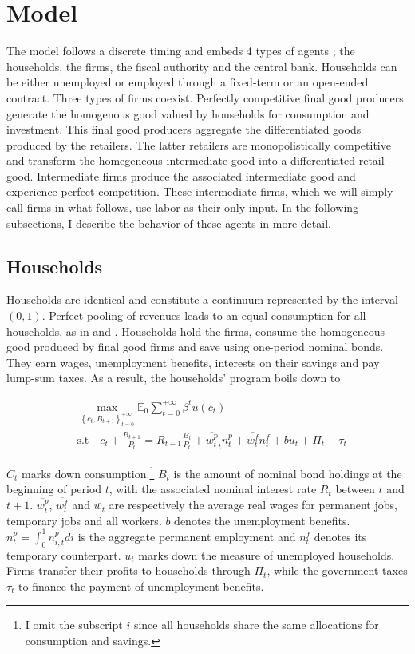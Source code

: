 \section{Model}

The model follows a discrete timing and embeds 4 types of agents ; the households, the firms, the fiscal authority and the central bank. Households can be either unemployed or employed through a fixed-term or an open-ended contract. Three types of firms coexist. Perfectly competitive final good producers generate the homogenous good valued by households for consumption and investment. This final good producers aggregate the differentiated goods produced by the retailers. The latter retailers are monopolistically competitive and transform the homegeneous intermediate good into a differentiated retail good. Intermediate firms produce the associated intermediate good and experience perfect competition. These intermediate firms, which we will simply call firms in what follows, use labor as their only input. In the following subsections, I describe the behavior of these agents in more detail.

\subsection{Households}

Households are identical and constitute a continuum represented  by the interval $(0,1)$. Perfect pooling of revenues leads to an equal consumption for all households, as in \citet{merz1995search} and \citet{andolfatto1996business}. Households hold the firms, consume the homogeneous good produced by final good firms and save using one-period nominal bonds. They earn wages, unemployment benefits, interests on their savings and pay lump-sum taxes. As a result, the households' program boils down to

\begin{align*}
&\max_{\left\{c_t, B_{t+1} \right\}_{t=0}^{+\infty}} \mathbb{E}_0 \sum_{t = 0}^{+\infty} \beta^t u\left(c_t\right)\\
&\text{s.t} \quad c_t + \frac{B_{t+1}}{P_t} = R_{t-1} \frac{B_{t}}{P_t} + \overline{w_t^p}_t n_t^p + \overline{w_t^f} n_t^f + b u_t + \Pi_t - \tau_t
\end{align*}

$C_t$ marks down consumption.\footnote{I omit the subscript $i$ since all households share the same allocations for consumption and savings.} $B_{t}$ is the amount of nominal bond holdings at the beginning of period $t$, with the associated nominal interest rate $R_t$ between $t$ and $t+1$. $\overline{w_t^p}$, $\overline{w_t^f}$ and $\overline{w_t}$ are respectively the average real wages for permanent jobs, temporary jobs and all workers. $b$ denotes the unemployment benefits. $n_t^p = \int_{0}^{1} n_{i,t}^p di$ is the aggregate permanent employment and $n_t^f$ denotes its temporary counterpart. $u_t$ marks down the measure of unemployed households. Firms transfer their profits to households through $\Pi_t$, while the government taxes $\tau_t$ to finance the payment of unemployment benefits.

